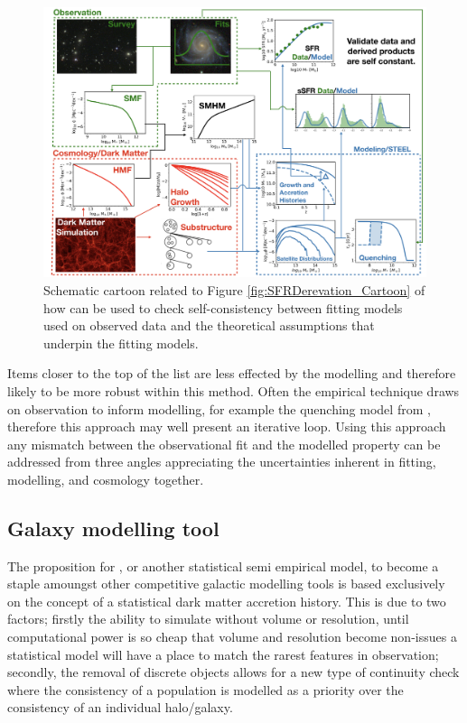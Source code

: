 \begin{figure}[t]
    \centering
    \includegraphics[width = \linewidth]{Figures/Chapter6/FullModelCartoon.png}
    \caption{Schematic cartoon related to Figure \ref{fig:SFRDerevation_Cartoon} of how \steel can be used to check self-consistency between fitting models used on observed data and the theoretical assumptions that underpin the fitting models.}
    \label{fig:Full_Mod_Toon}
\end{figure}
Items closer to the top of the list are less effected by the modelling and therefore likely to be more robust within this method. Often the empirical technique draws on observation to inform modelling, for example the quenching model from \citet{Wetzel2013GalaxyUniverse}, therefore this approach may well present an iterative loop. Using this approach any mismatch between the observational fit and the modelled property can be addressed from three angles appreciating the uncertainties inherent in fitting, modelling, and cosmology together.

\subsection{Galaxy modelling tool}

The proposition for \steel, or another statistical semi empirical model, to become a staple amoungst other competitive galactic modelling tools is based exclusively on the concept of a statistical dark matter accretion history. This is due to two factors; firstly the ability to simulate without volume or resolution, until computational power is so cheap that volume and resolution become non-issues a statistical model will have a place to match the rarest features in observation; secondly, the removal of discrete objects allows for a new type of continuity check where the consistency of a population is modelled as a priority over the consistency of an individual halo/galaxy. 

